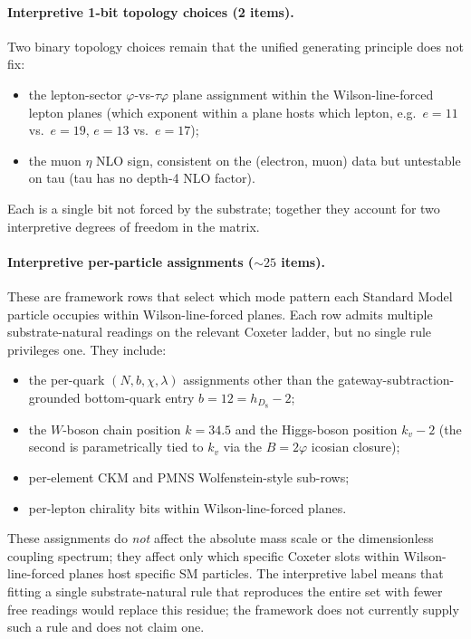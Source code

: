 ﻿\documentclass[reprint,amsmath,amssymb,aps,prd,longbibliography,floatfix]{revtex4-2}
\begin{document}
\paragraph{Interpretive 1-bit topology choices (2 items).} Two binary
topology choices remain that the unified generating principle does not
fix:
\begin{itemize}
\item the lepton-sector $\varphi$-vs-$\tau\varphi$ plane assignment
within the Wilson-line-forced lepton planes (which exponent within a
plane hosts which lepton, e.g.\ $e = 11$ vs.\ $e = 19$,
$e = 13$ vs.\ $e = 17$);
\item the muon $\eta$ NLO sign, consistent on the (electron, muon) data
but untestable on tau (tau has no depth-4 NLO factor).
\end{itemize}
Each is a single bit not forced by the substrate; together they account
for two interpretive degrees of freedom in the matrix.

\paragraph{Interpretive per-particle assignments ($\sim 25$ items).}
These are framework rows that select which mode pattern each Standard
Model particle occupies within Wilson-line-forced planes. Each row
admits multiple substrate-natural readings on the relevant Coxeter
ladder, but no single rule privileges one. They include:
\begin{itemize}
\item the per-quark $(N, b, \chi, \lambda)$ assignments other than the
gateway-subtraction-grounded bottom-quark entry $b = 12 = h_{D_8} - 2$;
\item the $W$-boson chain position $k = 34.5$ and the Higgs-boson
position $k_v - 2$ (the second is parametrically tied to $k_v$ via the
$B = 2\varphi$ icosian closure);
\item per-element CKM and PMNS Wolfenstein-style sub-rows;
\item per-lepton chirality bits within Wilson-line-forced planes.
\end{itemize}
These assignments do \emph{not} affect the absolute mass scale or the
dimensionless coupling spectrum; they affect only which specific
Coxeter slots within Wilson-line-forced planes host specific SM
particles. The interpretive label means that fitting a single
substrate-natural rule that reproduces the entire set with fewer free
readings would replace this residue; the framework does not currently
supply such a rule and does not claim one.
\end{document}
